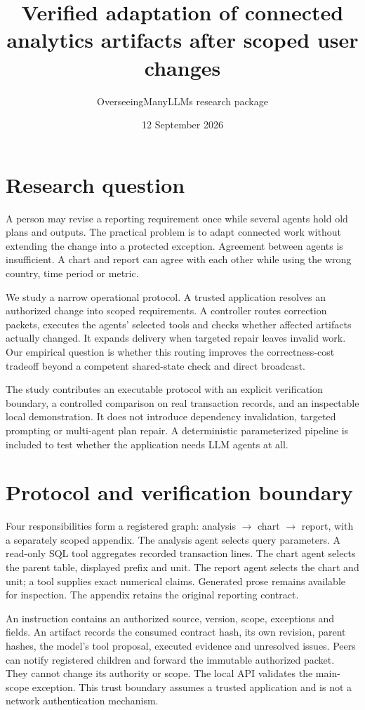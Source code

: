 \documentclass[10pt]{article}
\title{Verified adaptation of connected analytics artifacts after scoped user changes}
\author{OverseeingManyLLMs research package}
\date{12 September 2026}
\begin{document}
\maketitle

\section{Research question}
A person may revise a reporting requirement once while several agents hold old plans and outputs. The practical problem is to adapt connected work without extending the change into a protected exception. Agreement between agents is insufficient. A chart and report can agree with each other while using the wrong country, time period or metric.

We study a narrow operational protocol. A trusted application resolves an authorized change into scoped requirements. A controller routes correction packets, executes the agents' selected tools and checks whether affected artifacts actually changed. It expands delivery when targeted repair leaves invalid work. Our empirical question is whether this routing improves the correctness-cost tradeoff beyond a competent shared-state check and direct broadcast.

The study contributes an executable protocol with an explicit verification boundary, a controlled comparison on real transaction records, and an inspectable local demonstration. It does not introduce dependency invalidation, targeted prompting or multi-agent plan repair. A deterministic parameterized pipeline is included to test whether the application needs LLM agents at all.

\section{Protocol and verification boundary}
Four responsibilities form a registered graph: analysis $\rightarrow$ chart $\rightarrow$ report, with a separately scoped appendix. The analysis agent selects query parameters. A read-only SQL tool aggregates recorded transaction lines. The chart agent selects the parent table, displayed prefix and unit. The report agent selects the chart and unit; a tool supplies exact numerical claims. Generated prose remains available for inspection. The appendix retains the original reporting contract.

An instruction contains an authorized source, version, scope, exceptions and fields. An artifact records the consumed contract hash, its own revision, parent hashes, the model's tool proposal, executed evidence and unresolved issues. Peers can notify registered children and forward the immutable authorized packet. They cannot change its authority or scope. The local API validates the main-scope exception. This trust boundary assumes a trusted application and is not a network authentication mechanism.
\end{document}
